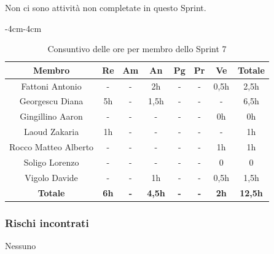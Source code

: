 \documentclass[a4paper,12pt]{article}
\begin{document}
Non ci sono attività non completate in questo Sprint.

\begin{table}[H]
    \begin{adjustwidth}{-4cm}{-4cm}
    \centering
    \begin{tabular}{|c|c|c|c|c|c|c|c|}
        \hline
        \textbf{Membro} & \textbf{Re} & \textbf{Am} & \textbf{An} & \textbf{Pg} & \textbf{Pr} & \textbf{Ve} & \textbf{Totale} \\
        \hline
        Fattoni Antonio      & -  & - & 2h & - & - & 0,5h & 2,5h \\
        \hline
        Georgescu Diana      & 5h & - & 1,5h & - & - & - & 6,5h \\
        \hline
        Gingillino Aaron     & -  & - & -    & - & - & 0h & 0h \\
        \hline
        Laoud Zakaria        & 1h  & - & -    & - & - & - & 1h \\
        \hline
        Rocco Matteo Alberto & -  & - & -    & - & - & 1h & 1h \\
        \hline
        Soligo Lorenzo       & -  & - & -    & - & - & 0 & 0 \\
        \hline
        Vigolo Davide        & -  & - & 1h    & - & - & 0,5h & 1,5h \\
        \hline
        \textbf{Totale} & \textbf{6h} & \textbf{-} & \textbf{4,5h} & \textbf{-} & \textbf{-} & \textbf{2h} & \textbf{12,5h} \\
        \hline
    \end{tabular}
    \caption{Consuntivo delle ore per membro dello Sprint 7}
    \end{adjustwidth}
\end{table}

\subsubsection{Rischi incontrati}
Nessuno
\end{document}
